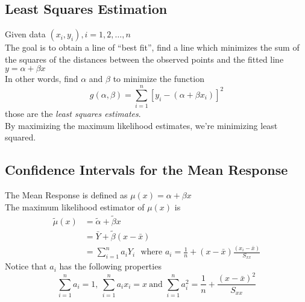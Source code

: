 \documentclass[12pt, leqno]{article}
\theoremstyle{definition}
\begin{document}
  \subsection{Least Squares Estimation}
  Given data $(x_{i}, y_{i}), i = 1, 2, \dots, n$ \\
  The goal is to obtain a line of ``best fit'', find a line which minimizes the sum of the squares of the distances between the observed points and the fitted line $y = \alpha + \beta x$ \\
  In other words, find $\alpha$ and $\beta$ to minimize the function
  $$g(\alpha, \beta) = \sum_{i=1}^{n}[y_{i} - (\alpha + \beta x_{i})]^{2}$$
  those are the \emph{least squares estimates}. \\
  By maximizing the maximum likelihood estimates, we're minimizing least squared.

  \subsection{Confidence Intervals for the Mean Response}
  The Mean Response is defined as $\mu(x) = \alpha + \beta x$ \\
  The maximum likelihood estimator of $\mu(x)$ is
  \begin{align*}
  \widetilde{\mu}(x) &= \widetilde{\alpha} + \widetilde{\beta}x \\
  &= \bar{Y} + \widetilde{\beta}(x - \bar{x}) \\
  &= \sum_{i=1}^{n}a_{i}Y_{i} ~~~\text{where } a_{i} = \frac{1}{n} + (x - \bar{x})\frac{(x_{i} - \bar{x})}{S_{xx}}
  \end{align*}
  Notice that $a_{i}$ has the following properties
  $$\sum_{i=1}^{n}a_{i} = 1, ~\sum_{i=1}^{n}a_{i}x_{i} = x ~\text{and } \sum_{i=1}^{n}a_{i}^{2} = \frac{1}{n} + \frac{(x - \bar{x})^{2}}{S_{xx}}$$
\end{document}
